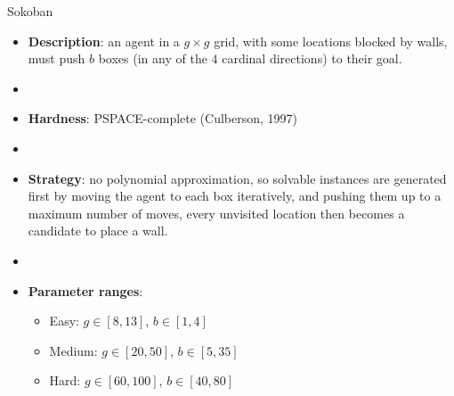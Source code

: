 \documentclass[aspectratio=169,xcolor=dvipsnames]{beamer}
\begin{document}
\begin{frame}{Sokoban}

    \begin{itemize}
        \item \textbf{Description}: an agent in a $g\times g$ grid, with some locations blocked by walls, must push $b$ boxes (in any of the $4$ cardinal directions) to their goal.
        \item[]
        \item \textbf{Hardness}: PSPACE-complete (Culberson, 1997) %
        \item[]
        \item \textbf{Strategy}: no polynomial approximation, so solvable instances are generated first by moving the agent to each box iteratively, and pushing them up to a maximum number of moves, every unvisited location then becomes a candidate to place a wall.
        \item[]
        \item \textbf{Parameter ranges}:
        \begin{itemize}
            \item Easy: $g\in[8, 13]$, $b\in[1, 4]$
            \item Medium: $g\in[20, 50]$, $b\in [5,35]$
            \item Hard: $g\in[60, 100]$, $b\in[40,80]$
        \end{itemize}
    \end{itemize}

\end{frame}
\end{document}
